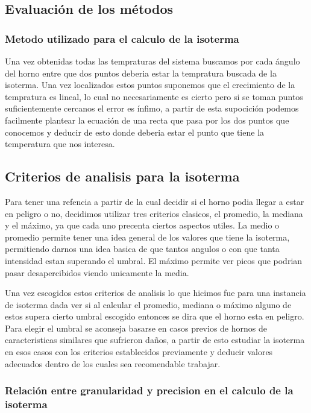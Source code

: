\subsection{Evaluación de los métodos}

\subsubsection{Metodo utilizado para el calculo de la isoterma}

Una vez obtenidas todas las tempraturas del sistema buscamos por cada ángulo del horno entre que dos puntos deberia estar la tempratura buscada de la isoterma. Una vez localizados estos puntos suponemos que el crecimiento de la tempratura es lineal, lo cual no necesariamente es cierto pero si se toman puntos suficientemente cercanos el error es ínfimo, a partir de esta supocición podemos facilmente plantear la ecuación de una recta que pasa por los dos puntos que conocemos y deducir de esto donde deberia estar el punto que tiene la temperatura que nos interesa.

\subsection{Criterios de analisis para la isoterma}
 Para tener una refencia a partir de la cual decidir si el horno podia llegar a estar en peligro o no, decidimos utilizar tres criterios clasicos, el promedio, la mediana y el máximo, ya que cada uno precenta ciertos aspectos utiles. La medio o promedio permite tener una idea general de los valores que tiene la isoterma, permitiendo darnos una idea basica de que tantos angulos o con que tanta intensidad estan superando el umbral. El máximo permite ver picos que podrian pasar desapercibidos viendo unicamente la media.

Una vez escogidos estos criterios de analisis lo que hicimos fue para una instancia de isoterma dada ver si al calcular el promedio, mediana o máximo alguno de estos supera cierto umbral escogido entonces se dira que el horno esta en peligro. Para elegir el umbral se aconseja basarse en casos previos de hornos de caracteristicas similares que sufrieron daños, a partir de esto estudiar la isoterma en esos casos con los criterios establecidos previamente y deducir valores adecuados dentro de los cuales sea recomendable trabajar.

\subsubsection{Relación entre granularidad y precision en el calculo de la isoterma}

